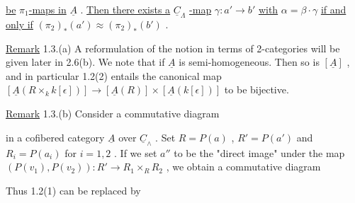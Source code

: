 \begin{center}
\end{center}
\underline{be}  $\pi_1$\underline{-maps in}  $\underline{A}$  . \underline{Then there exists a}  $\underline{C}_{\Lambda}$  \underline{-map}  $\gamma : a' \longrightarrow b'$  \underline{with}  $\alpha = \beta\cdot\gamma$ \underline{if and only if}  $(\pi_2)_{*}(a') \approx (\pi_2)_{*}(b')$  .

\underline{Remark} 1.3.(a)  A reformulation of the notion in terms of  2-categories will be given later in 2.6(b). We note that if  $\underline{A}$  is semi-homogeneous. Then so is  $[\underline{A}]$  , and in particular 1.2(2) entails the canonical map
$[\underline{A}(R \times_{k} k[\epsilon])] \longrightarrow [\underline{A}(R)] \times [\underline{A}(k[\epsilon])]$
to be bijective.

\underline{Remark} 1.3.(b)    Consider a commutative diagram

\begin{center}
\end{center}
in a cofibered category  $\underline{A}$  over  $\underline{C}_{\wedge}$ . Set  $R = P(a)$ , $R' = P(a')$  and
$R_{i} = P(a_{i})$  for  $i = 1, 2$ . If we set  $a''$  to be the  "direct image"  under the
map  $(P(v_{1}),P(v_{2})) : R' \to R_{1} \times_{R} R_{2}$ , we obtain a commutative diagram

\begin{center}
\end{center}
Thus 1.2(1) can be replaced by

